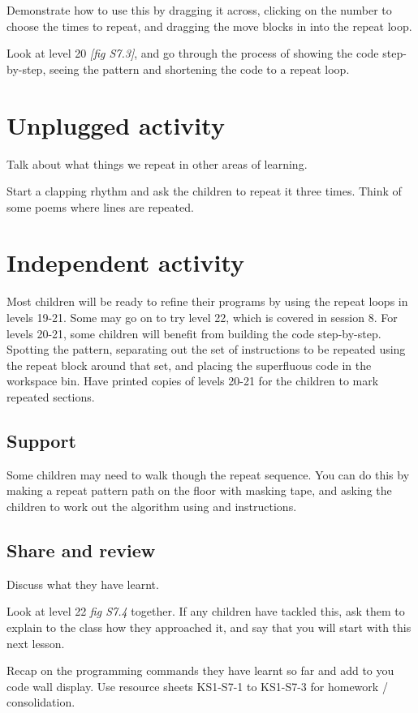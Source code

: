\documentclass{../../../lessonplan}
\begin{document}
\begin{lessonplan}
Demonstrate how to use this by dragging it across, clicking on the number to choose the times to repeat, and dragging the move blocks in into the repeat loop.

Look at level 20 \textit{[fig S7.3]}, and go through the process of showing the code step-by-step, seeing the pattern and shortening the code to a repeat loop.


\section*{Unplugged activity}

Talk about what things we repeat in other areas of learning.

Start a clapping rhythm and ask the children to repeat it three times.
Think of some poems where lines are repeated.

\section*{Independent activity}

Most children will be ready to refine their programs by using the repeat loops in levels 19-21.
Some may go on to try level 22, which is covered in session 8.
For levels 20-21, some children will benefit from building the code step-by-step.
Spotting the pattern, separating out the set of instructions to be repeated using the repeat block around that set, and placing the superfluous code in the workspace bin.
Have printed copies of levels 20-21 for the children to mark repeated sections.

\subsection*{Support}

Some children may need to walk though the repeat sequence.
You can do this by making a repeat pattern path on the floor with masking tape, and asking the children to work out the algorithm using  and  instructions.

\subsection*{Share and review}

Discuss what they have learnt.


Look at level 22 \textit{fig S7.4} together.
If any children have tackled this, ask them to explain to the class how they approached it, and say that you will start with this next lesson.


Recap on the programming commands they have learnt so far and add  to you code wall display.
Use resource sheets KS1-S7-1 to KS1-S7-3 for homework / consolidation.

\end{lessonplan}
\end{document}
